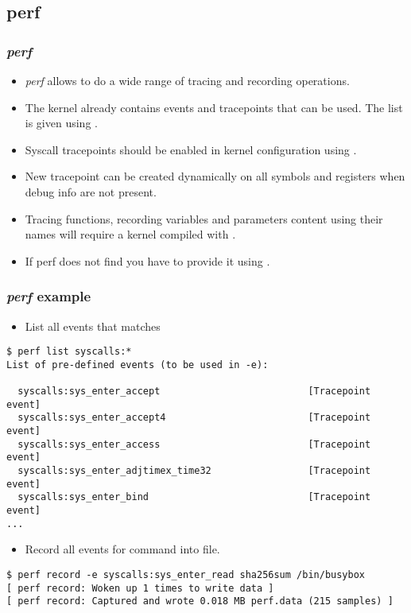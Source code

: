 \subsection{perf}

\begin{frame}
  \frametitle{{\em perf}}
  \begin{itemize}
    \item {\em perf} allows to do a wide range of tracing and recording operations.
    \item The kernel already contains events and tracepoints that can be used.
          The list is given using .
    \item Syscall tracepoints should be enabled in kernel configuration using
          .
    \item New tracepoint can be created dynamically on all symbols and registers
          when debug info are not present.
    \item Tracing functions, recording variables and parameters content using
          their names will require a kernel compiled with
          .
    \item If perf does not find  you have to provide it
          using .
  \end{itemize}
\end{frame}

\begin{frame}[fragile]
  \frametitle{{\em perf} example}
  \begin{itemize}
    \item List all events that matches 
  \end{itemize}
  \begin{block}{}
    \begin{verbatim}
$ perf list syscalls:*
List of pre-defined events (to be used in -e):

  syscalls:sys_enter_accept                          [Tracepoint event]
  syscalls:sys_enter_accept4                         [Tracepoint event]
  syscalls:sys_enter_access                          [Tracepoint event]
  syscalls:sys_enter_adjtimex_time32                 [Tracepoint event]
  syscalls:sys_enter_bind                            [Tracepoint event]
...
    \end{verbatim}
  \end{block}
  \begin{itemize}
    \item Record all  events for 
          command into  file.
  \end{itemize}
  \begin{block}{}
    \begin{verbatim}
$ perf record -e syscalls:sys_enter_read sha256sum /bin/busybox
[ perf record: Woken up 1 times to write data ]
[ perf record: Captured and wrote 0.018 MB perf.data (215 samples) ]
    \end{verbatim}
  \end{block}
\end{frame}

